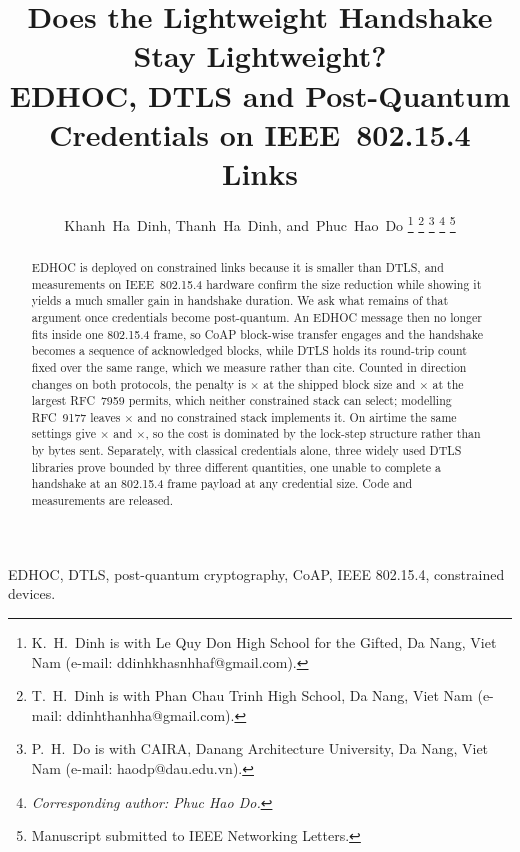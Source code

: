 \documentclass[journal]{IEEEtran}
\begin{document}
\title{Does the Lightweight Handshake Stay Lightweight?\\
EDHOC, DTLS and Post-Quantum Credentials on IEEE~802.15.4 Links}
\author{Khanh~Ha~Dinh,
Thanh~Ha~Dinh,
and~Phuc~Hao~Do%
\thanks{K.~H.~Dinh is with Le Quy Don High School for the Gifted, Da Nang, Viet Nam
(e-mail: ddinhkhasnhhaf@gmail.com).}%
\thanks{T.~H.~Dinh is with Phan Chau Trinh High School, Da Nang, Viet Nam
(e-mail: ddinhthanhha@gmail.com).}%
\thanks{P.~H.~Do is with CAIRA, Danang Architecture University, Da Nang, Viet Nam
(e-mail: haodp@dau.edu.vn).}%
\thanks{\textit{Corresponding author: Phuc Hao Do.}}%
\thanks{Manuscript submitted to IEEE Networking Letters.}}

\maketitle

\begin{abstract}
EDHOC is deployed on constrained links because it is smaller than DTLS, and measurements on
IEEE~802.15.4 hardware confirm the size reduction while showing it yields a much smaller gain
in handshake duration. We ask what remains of that argument once credentials become
post-quantum. An EDHOC message then no longer fits inside one 802.15.4 frame, so CoAP
block-wise transfer engages and the handshake becomes a sequence of acknowledged blocks, while
DTLS holds its round-trip count fixed over the same range, which we measure rather than cite.
Counted in direction changes on both protocols, the penalty is \numRatioDefault$\times$ at the
shipped block size and \numRatioBest$\times$ at the largest RFC~7959 permits, which neither
constrained stack can select; modelling RFC~9177 leaves \numRatioQBlock$\times$ and no
constrained stack implements it. On airtime the same settings give
\numRatioFramesDefault$\times$ and \numRatioFrames$\times$, so the cost is dominated by the
lock-step structure rather than by bytes sent. Separately, with classical credentials alone,
three widely used DTLS libraries prove bounded by three different quantities, one unable to
complete a handshake at an 802.15.4 frame payload at any credential size. Code and measurements
are released.
\end{abstract}

\begin{IEEEkeywords}
EDHOC, DTLS, post-quantum cryptography, CoAP, IEEE 802.15.4, constrained devices.
\end{IEEEkeywords}
\end{document}
